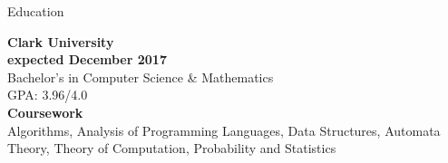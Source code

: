 \documentclass{resume} %
\begin{document}

\begin{rSection}{Education}

\begin{multicols}{2}

{\bf Clark University}\\
{\textcolor{mygray}{\textbf{expected December 2017}}} \\ 
Bachelor's in Computer Science \& Mathematics \\
GPA: 3.96/4.0  \smallskip \\
\vfill
\columnbreak
\textbf{Coursework} \\ Algorithms, Analysis of Programming Languages, Data Structures, Automata Theory, Theory of Computation, Probability and Statistics

\end{multicols}

\end{rSection}

\end{document}
